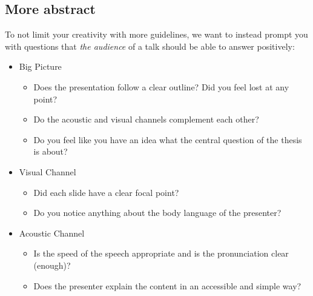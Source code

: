 \documentclass[twocolumn]{mlai-guide}
\begin{document}
\subsection{More abstract}

To not limit your creativity with more guidelines, we want to instead prompt you with questions that \textit{the audience} of a talk should be able to answer positively:

\begin{itemize}
    \item Big Picture
        \begin{itemize}
            \item Does the presentation follow a clear outline? Did you feel lost at any point?
            \item Do the acoustic and visual channels complement each other?
            \item Do you feel like you have an idea what the central question of the thesis is about?
        \end{itemize}
    \item Visual Channel
        \begin{itemize}
            \item Did each slide have a clear focal point?
            \item Do you notice anything about the body language of the presenter?
        \end{itemize}
    \item Acoustic Channel
        \begin{itemize}
            \item Is the speed of the speech appropriate and is the pronunciation clear (enough)?
            \item Does the presenter explain the content in an accessible and simple way?
        \end{itemize}
\end{itemize}
\end{document}
